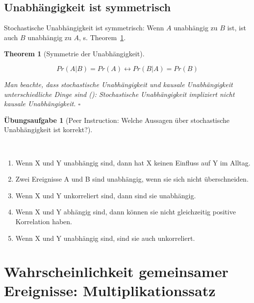 \documentclass[
  ngerman,
  letterpaper,
  twoside,
  open=any]{scrbook}
\providecommand{\tightlist}{%
  \setlength{\itemsep}{0pt}\setlength{\parskip}{0pt}}\usepackage{longtable,booktabs,array}
\theoremstyle{definition}
\theoremstyle{plain}
\newtheorem{theorem}{Theorem}[chapter]
\theoremstyle{definition}
\newtheorem{exercise}{Übungsaufgabe}[chapter]
\theoremstyle{definition}
\theoremstyle{definition}
\theoremstyle{definition}
\newtheorem{exercise}{Übungsaufgabe}[chapter]
\theoremstyle{remark}
\begin{document}
\subsection{Unabhängigkeit ist
symmetrisch}\label{unabhuxe4ngigkeit-ist-symmetrisch}

Stochastische Unabhängigkeit ist symmetrisch: Wenn \(A\) unabhängig zu
\(B\) ist, ist auch \(B\) unabhängig zu \(A\), s.
Theorem~\ref{thm-indep-symm}.

\begin{theorem}[Symmetrie der
Unabhängigkeit]\protect\hypertarget{thm-indep-symm}{}\label{thm-indep-symm}

\[Pr(A|B) = Pr(A) \leftrightarrow Pr(B|A) = Pr(B)\]

Man beachte, dass stochastische Unabhängigkeit und kausale
Unabhängigkeit unterschiedliche Dinge sind
(): Stochastische Unabhängigkeit
impliziert nicht kausale Unabhängigkeit. \(\square\)

\end{theorem}

\begin{exercise}[Peer Instruction: Welche Aussagen über stochastische
Unabhängigkeit ist
korrekt?]\protect\hypertarget{exr-indep}{}\label{exr-indep}

~

\begin{enumerate}
\def\labelenumi{\arabic{enumi}.}
\tightlist
\item
  Wenn X und Y unabhängig sind, dann hat X keinen Einfluss auf Y im
  Alltag.\\
\item
  Zwei Ereignisse A und B sind unabhängig, wenn sie sich nicht
  überschneiden.\\
\item
  Wenn X und Y unkorreliert sind, dann sind sie unabhängig.
\item
  Wenn X und Y abhängig sind, dann können sie nicht gleichzeitig
  positive Korrelation haben.
\item
  Wenn X und Y unabhängig sind, sind sie auch unkorreliert.
\end{enumerate}

\end{exercise}

\section{Wahrscheinlichkeit gemeinsamer Ereignisse:
Multiplikationssatz}\label{wahrscheinlichkeit-gemeinsamer-ereignisse-multiplikationssatz}
\end{document}
